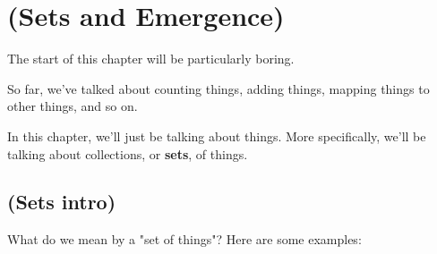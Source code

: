 


\chapter{(Sets and Emergence)}


The start of this chapter will be particularly boring. 

So far, we've talked about counting things, adding things, mapping things to other things, and so on.

In this chapter, we'll just be talking about things. More specifically, we'll be talking about collections, or \textbf{sets}, of things.


\section{(Sets intro)}

What do we mean by a "set of things"? Here are some examples:

